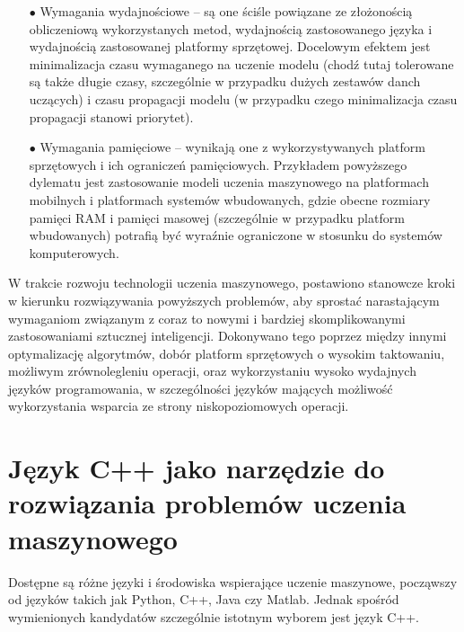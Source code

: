 \begin{itemize}
    \item [$\bullet$] Wymagania wydajnościowe -- są one ściśle powiązane ze złożonością obliczeniową wykorzystanych metod, wydajnością zastosowanego języka i wydajnością zastosowanej platformy sprzętowej. Docelowym efektem jest minimalizacja czasu wymaganego na uczenie modelu (chodź tutaj tolerowane są także długie czasy, szczególnie w przypadku dużych zestawów danch uczących) i czasu propagacji modelu (w przypadku czego minimalizacja czasu propagacji stanowi priorytet).
    
    \item [$\bullet$] Wymagania pamięciowe -- wynikają one z wykorzystywanych platform sprzętowych i ich ograniczeń pamięciowych. Przykładem powyższego dylematu jest zastosowanie modeli uczenia maszynowego na platformach mobilnych i platformach systemów wbudowanych, gdzie obecne rozmiary pamięci RAM i pamięci masowej (szczególnie w przypadku platform wbudowanych) potrafią być wyraźnie ograniczone w stosunku do systemów komputerowych.
\end{itemize}

W trakcie rozwoju technologii uczenia maszynowego, postawiono stanowcze kroki w kierunku rozwiązywania powyższych problemów, aby sprostać narastającym wymaganiom związanym z coraz to nowymi i bardziej skomplikowanymi zastosowaniami sztucznej inteligencji. Dokonywano tego poprzez między innymi optymalizację algorytmów, dobór platform sprzętowych o wysokim taktowaniu, możliwym zrównolegleniu operacji, oraz wykorzystaniu wysoko wydajnych języków programowania, w szczególności języków mających możliwość wykorzystania wsparcia ze strony niskopoziomowych operacji.

\section{Język C++ jako narzędzie do rozwiązania problemów uczenia maszynowego}

Dostępne są różne języki i środowiska wspierające uczenie maszynowe, począwszy od języków takich jak Python, C++, Java czy Matlab. Jednak spośród wymienionych kandydatów szczególnie istotnym wyborem jest język C++. 

